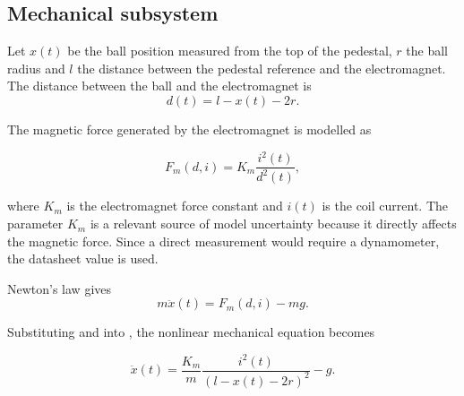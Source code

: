 \subsection{Mechanical subsystem}

Let $x(t)$ be the ball position measured from the top of the pedestal, 
$r$ the ball radius and $l$ the distance between the pedestal reference 
and the electromagnet. The distance between the ball and the electromagnet is
\begin{equation}
    d(t) = l - x(t) - 2r .
    \label{eq:air_gap}
\end{equation}

The magnetic force generated by the electromagnet is modelled as

\begin{equation}
    F_m(d,i) = K_m \frac{i^2(t)}{d^2(t)} ,
    \label{eq:magnetic_force}
\end{equation}

where $K_m$ is the electromagnet force constant and $i(t)$ is the coil current.
The parameter $K_m$ is a relevant source of model uncertainty because it directly affects the magnetic
force. Since a direct measurement would require a dynamometer, the datasheet value is used.

Newton's law gives
\begin{equation}
    m\ddot{x}(t) = F_m(d,i) - mg .
    \label{eq:newton}
\end{equation}

Substituting  and  into 
, the nonlinear mechanical equation becomes

\begin{equation}
    \ddot{x}(t) =
    \frac{K_m}{m}
    \frac{i^2(t)}{\left(l-x(t)-2r\right)^2}
    - g .
    \label{eq:mechanical_nonlinear}
\end{equation}
